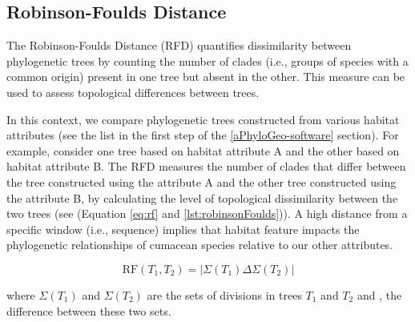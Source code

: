\subsection{Robinson-Foulds Distance}\label{RF}

The Robinson-Foulds Distance (RFD) quantifies dissimilarity between phylogenetic trees by counting the number of clades (i.e., groups of species with a common origin) present in one tree but absent in the other. This measure can be used to assess topological differences between trees. 

In this context, we compare phylogenetic trees constructed from various habitat attributes (see the list in the first step of the \autoref{aPhyloGeo-software} section). For example, consider one tree based on habitat attribute A and the other based on habitat attribute B. The RFD measures the number of clades that differ between the tree constructed using the attribute A and the other tree constructed using the attribute B, by calculating the level of topological dissimilarity between the two trees (see (Equation \eqref{eq:rf} and \autoref{lst:robinsonFoulds})). A high distance from a specific window (i.e., sequence) implies that habitat feature impacts the phylogenetic relationships of cumacean species relative to our other attributes.

\begin{equation}\label{eq:rf}
    \text{RF}(T_1, T_2) = | \Sigma(T_1) \Delta \Sigma(T_2) |
\end{equation}

where $\Sigma(T_1)$ and $\Sigma(T_2)$ are the sets of divisions in trees $T_1$ and $T_2$ and \Delta, the difference between these two sets.

